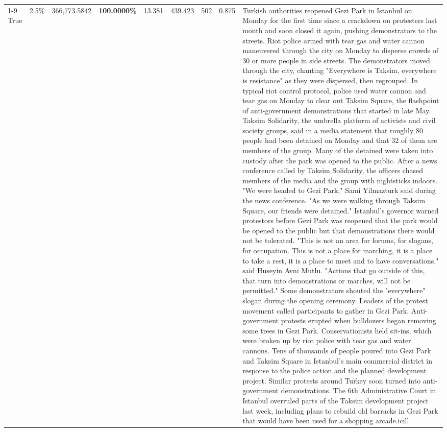 \begin{table}[H]
\begin{tabular}{lllrlllll}
\cline{1-9}
True & 2.5\% & 366,773.5842 & \bfseries \color{red} 100.0000\% & 13.381 & 439.423 & 502 & 0.875 & Turkish authorities reopened Gezi Park in Istanbul on Monday for the first time since a crackdown on protesters last month and soon closed it again, pushing demonstrators to the streets. Riot police armed with tear gas and water cannon maneuvered through the city on Monday to disperse crowds of 30 or more people in side streets. The demonstrators moved through the city, chanting "Everywhere is Taksim, everywhere is resistance" as they were dispersed, then regrouped. In typical riot control protocol, police used water cannon and tear gas on Monday to clear out Taksim Square, the flashpoint of anti-government demonstrations that started in late May. Taksim Solidarity, the umbrella platform of activists and civil society groups, said in a media statement that roughly 80 people had been detained on Monday and that 32 of them are members of the group. Many of the detained were taken into custody after the park was opened to the public. After a news conference called by Taksim Solidarity, the officers chased members of the media and the group with nightsticks indoors. "We were headed to Gezi Park," Sami Yilmazturk said during the news conference. "As we were walking through Taksim Square, our friends were detained." Istanbul's governor warned protestors before Gezi Park was reopened that the park would be opened to the public but that demonstrations there would not be tolerated. "This is not an area for forums, for slogans, for occupation. This is not a place for marching, it is a place to take a rest, it is a place to meet and to have conversations," said Huseyin Avni Mutlu. "Actions that go outside of this, that turn into demonstrations or marches, will not be permitted." Some demonstrators shouted the "everywhere" slogan during the opening ceremony. Leaders of the protest movement called participants to gather in Gezi Park. Anti-government protests erupted when bulldozers began removing some trees in Gezi Park. Conservationists held sit-ins, which were broken up by riot police with tear gas and water cannons. Tens of thousands of people poured into Gezi Park and Taksim Square in Istanbul's main commercial district in response to the police action and the planned development project. Similar protests around Turkey soon turned into anti-government demonstrations. The 6th Administrative Court in Istanbul overruled parts of the Taksim development project last week, including plans to rebuild old barracks in Gezi Park that would have been used for a shopping arcade.icill \\

\end{tabular}
\end{table}
